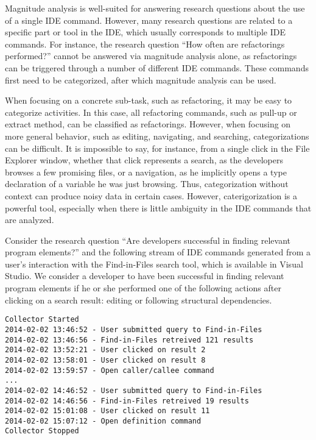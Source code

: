 Magnitude analysis is well-suited for answering research questions about the use of a single IDE command. However, many research questions are related to a specific part or tool in the IDE, which usually corresponds to multiple IDE commands. For instance, the research question ``How often are refactorings performed?'' cannot be answered via magnitude analysis alone, as refactorings can be triggered through a number of different IDE commands. These commands first need to be categorized, after which magnitude analysis can be used. 

When focusing on a concrete sub-task, such as refactoring, it may be easy to categorize activities. In this case, all refactoring commands, such as pull-up or extract method, can be classified as refactorings. However, when focusing on more general behavior, such as editing, navigating, and searching, categorizations can be difficult. It is impossible to say, for instance, from a single click in the File Explorer window, whether that click represents a search, as the developers browses a few promising files, or a navigation, as he implicitly opens a type declaration of a variable he was just browsing. Thus, categorization without context can produce noisy data in certain cases. However, caterigorization is a powerful tool, especially when there is little ambiguity in the IDE commands that are analyzed.

Consider the research question ``Are developers successful in finding relevant program elements?'' and the following stream of IDE commands generated from a user's interaction with the Find-in-Files search tool, which is available in Visual Studio. We consider a developer to have been successful in finding relevant program elements if he or she performed one of the following actions after clicking on a search result: editing or following structural dependencies.

\begin{verbatim}
Collector Started
2014-02-02 13:46:52 - User submitted query to Find-in-Files
2014-02-02 13:46:56 - Find-in-Files retreived 121 results
2014-02-02 13:52:21 - User clicked on result 2
2014-02-02 13:58:01 - User clicked on result 8
2014-02-02 13:59:57 - Open caller/callee command 
...
2014-02-02 14:46:52 - User submitted query to Find-in-Files
2014-02-02 14:46:56 - Find-in-Files retreived 19 results
2014-02-02 15:01:08 - User clicked on result 11
2014-02-02 15:07:12 - Open definition command
Collector Stopped
\end{verbatim}

